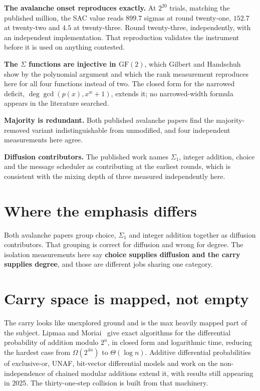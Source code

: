 \textbf{The avalanche onset reproduces exactly.} At \(2^{20}\) trials, matching the published million, the SAC value reads \(899.7\) sigmas at round twenty-one, \(152.7\) at twenty-two and \(4.5\) at twenty-three. Round twenty-three, independently, with an independent implementation. That reproduction validates the instrument before it is used on anything contested.

\textbf{The \(\Sigma\) functions are injective in \(\mathrm{GF}(2)\)}, which Gilbert and Handschuh~\cite{src:Handschuh} show by the polynomial argument and which the rank measurement reproduces here for all four functions instead of two. The closed form for the narrowed deficit, \(\deg \gcd(p(x), x^w+1)\), extends it; no narrowed-width formula appears in the literature searched.

\textbf{Majority is redundant.} Both published avalanche papers find the majority-removed variant indistinguishable from unmodified, and four independent measurements here agree.

\textbf{Diffusion contributors.} The published work names \(\Sigma_1\), integer addition, choice and the message scheduler as contributing at the earliest rounds, which is consistent with the mixing depth of three measured independently here.

\section{Where the emphasis differs}

Both avalanche papers group choice, \(\Sigma_1\) and integer addition together as diffusion contributors. That grouping is correct for diffusion and wrong for degree. The isolation measurements here say \textbf{choice supplies diffusion and the carry supplies degree}, and those are different jobs sharing one category.

\section{Carry space is mapped, not empty}

The carry looks like unexplored ground and is the max heavily mapped part of the subject. Lipmaa and Moriai~\cite{src:Lipmaa-and-Moriai} give exact algorithms for the differential probability of addition modulo \(2^n\), in closed form and logarithmic time, reducing the hardest case from \(\Omega(2^{4n})\) to \(\Theta(\log n)\). Additive differential probabilities of exclusive-or, UNAF, bit-vector differential models and work on the non-independence of chained modular additions extend it, with results still appearing in 2025. The thirty-one-step collision is built from that machinery.


